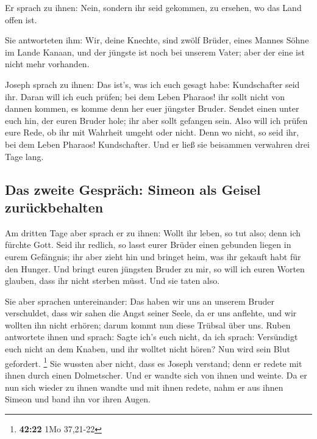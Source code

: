  Er sprach zu ihnen: Nein, sondern ihr seid gekommen, zu
ersehen, wo das Land offen ist.

 Sie antworteten ihm: Wir, deine Knechte, sind zwölf
Brüder, eines Mannes Söhne im Lande Kanaan, und der jüngste ist noch bei
unserem Vater; aber der eine ist nicht mehr vorhanden.

 Joseph sprach zu ihnen: Das ist's, was ich euch gesagt
habe: Kundschafter seid ihr.  Daran will ich euch prüfen;
bei dem Leben Pharaos! ihr sollt nicht von dannen kommen, es komme denn
her euer jüngster Bruder.  Sendet einen unter euch hin,
der euren Bruder hole; ihr aber sollt gefangen sein. Also will ich
prüfen eure Rede, ob ihr mit Wahrheit umgeht oder nicht. Denn wo nicht,
so seid ihr, bei dem Leben Pharaos! Kundschafter.  Und er
ließ sie beisammen verwahren drei Tage lang.

\hypertarget{das-zweite-gespruxe4ch-simeon-als-geisel-zuruxfcckbehalten}{%
\subsection{Das zweite Gespräch: Simeon als Geisel
zurückbehalten}\label{das-zweite-gespruxe4ch-simeon-als-geisel-zuruxfcckbehalten}}

 Am dritten Tage aber sprach er zu ihnen: Wollt ihr
leben, so tut also; denn ich fürchte Gott.  Seid ihr
redlich, so lasst eurer Brüder einen gebunden liegen in eurem Gefängnis;
ihr aber zieht hin und bringet heim, was ihr gekauft habt für den
Hunger.  Und bringt euren jüngsten Bruder zu mir, so will
ich euren Worten glauben, dass ihr nicht sterben müsst. Und sie taten
also.

 Sie aber sprachen untereinander: Das haben wir uns an
unserem Bruder verschuldet, dass wir sahen die Angst seiner Seele, da er
uns anflehte, und wir wollten ihn nicht erhören; darum kommt nun diese
Trübsal über uns.  Ruben antwortete ihnen und sprach:
Sagte ich's euch nicht, da ich sprach: Versündigt euch nicht an dem
Knaben, und ihr wolltet nicht hören? Nun wird sein Blut gefordert.
\footnote{\textbf{42:22} 1Mo 37,21-22}  Sie wussten aber
nicht, dass es Joseph verstand; denn er redete mit ihnen durch einen
Dolmetscher.  Und er wandte sich von ihnen und weinte. Da
er nun sich wieder zu ihnen wandte und mit ihnen redete, nahm er aus
ihnen Simeon und band ihn vor ihren Augen.

